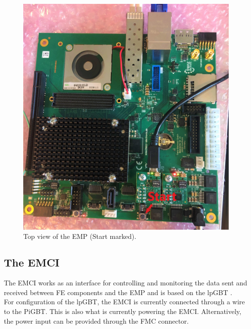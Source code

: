 \begin{figure}[H]
    \centering
    \includegraphics[width=1\textwidth]{Graphics/EMP_start.jpg}
    \caption{Top view of the EMP (Start marked).}
    \label{fig:EMP_start}
\end{figure}
\newpage
\subsection{The EMCI}

The EMCI works as an interface for controlling and monitoring the data sent and received between FE components and the EMP and is based on the lpGBT \cite{lpGBTMan75:online}. \\

\noindent For configuration of the lpGBT, the EMCI is currently connected through a wire to the PiGBT. This is also what is currently powering the EMCI. Alternatively, the power input can be provided through the FMC connector. 

